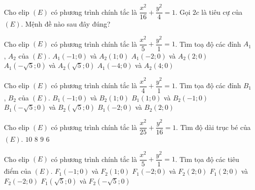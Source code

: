 

\begin{ex}%
	Cho elip $(E)$ có phương  trình chính tắc là
	$\dfrac{x^2}{16}+\dfrac{y^2}{4}=1$. Gọi $2c$ là tiêu  cự của
	$(E)$.  Mệnh đề nào sau đây đúng?
\end{ex}

\begin{ex}%
	Cho  elip $(E)$ có phương trình chính tắc là $\dfrac{x^2}{5}+\dfrac{y^2}{1}=1$. Tìm toạ độ các đỉnh $A_1$, $A_2$ của $(E)$.
	\choice 
		{ $A_1(-1;0)$ và $A_2(1;0)$} 
		{$A_1(-2;0)$ và  $A_2(2;0)$}
		 {\True $A_1\left(-\sqrt{5};0\right)$ và $A_2\left(\sqrt{5};0\right)$}
		{$A_1(-4;0)$  và $A_2(4;0)$}
\end{ex}

\begin{ex}%
	Cho elip $(E)$ có phương trình chính tắc là $\dfrac{x^2}{4}+\dfrac{y^2}{1}=1$. Tìm tọa độ các đỉnh $B_1$, $B_2$  của $(E)$.
	 \choice
		{\True $B_1(-1;0)$  và $B_2(1;0)$}
		 {$B_1(1;0)$ và $B_2(-1;0)$}
		{ $B_1(-\sqrt{5};0)$  và $B_2(\sqrt{5};0)$}
		{$B_1(-2;0)$ và $B_2(2;0)$} 
\end{ex}

\begin{ex}%
	Cho elip $(E)$ có phương trình  chính tắc là $\dfrac{x^2}{25}+\dfrac{y^2}{16}=1$. Tìm độ dài trục bé của $(E)$.
	 \choice
		 { $10$}
		 {\True $8$}
		 {$9$}
		 {$6$}
\end{ex}

\begin{ex}%
	Cho elip $(E)$ có phương trình chính tắc là $\dfrac{x^2}{5}+\dfrac{y^2}{1}=1$. Tìm tọa độ các tiêu điểm của  $(E)$.
	\choice 
		{ $F_1(-1;0)$  và $F_2(1;0)$}
		{\True $F_1(-2;0)$ và $F_2(2;0)$} 
		{$F_1(2;0)$  và $F_2(-2;0)$}
		{$F_1(\sqrt{5};0)$ và  $F_2(-\sqrt{5};0)$}
\end{ex}

